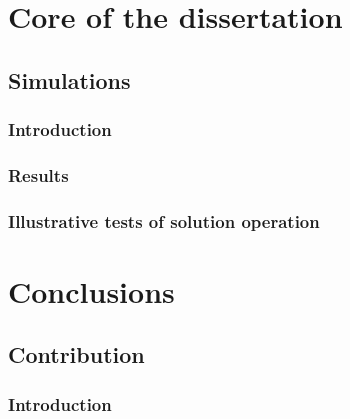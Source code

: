 \documentclass[
  oneside,
  11pt, a4paper,
  footinclude=true,
  headinclude=true,
  cleardoublepage=empty
]{scrbook}
\begin{document}







\part{Core of the dissertation}%


\chapter{{Simulations}}
\section{Introduction}
\section{Results}


\section{Illustrative tests of solution operation}


\part{Conclusions}

\chapter{Contribution}
\section{Introduction}
\end{document}

